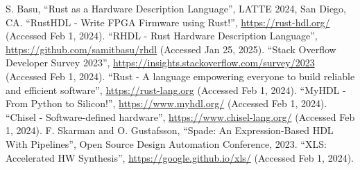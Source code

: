 \documentclass[sigplan,screen,sigconf]{acmart}
\begin{document}
\begin{thebibliography}{00}
   S. Basu, ``Rust as a Hardware Description Language'', LATTE 2024, San Diego, CA.
   ``RustHDL - Write FPGA Firmware using Rust!'', \url{https://rust-hdl.org/} (Accessed Feb 1, 2024).
   ``RHDL - Rust Hardware Description Language'', \url{https://github.com/samitbasu/rhdl} (Accessed Jan 25, 2025).
   ``Stack Overflow Developer Survey 2023'', \url{https://insights.stackoverflow.com/survey/2023} (Accessed Feb 1, 2024).
   ``Rust - A language empowering everyone to build reliable and efficient software'', \url{https://rust-lang.org} (Accessed Feb 1, 2024).
   ``MyHDL - From Python to Silicon!'', \url{https://www.myhdl.org/} (Accessed Feb 1, 2024).
   ``Chisel - Software-defined hardware'', \url{https://www.chisel-lang.org/} (Accessed Feb 1, 2024).
   F. Skarman and O. Gustafsson, ``Spade: An Expression-Based HDL With Pipelines'', Open Source Design Automation Conference, 2023.
   ``XLS: Accelerated HW Synthesis'', \url{https://google.github.io/xls/} (Accessed Feb 1, 2024).
\end{thebibliography}
\end{document}
